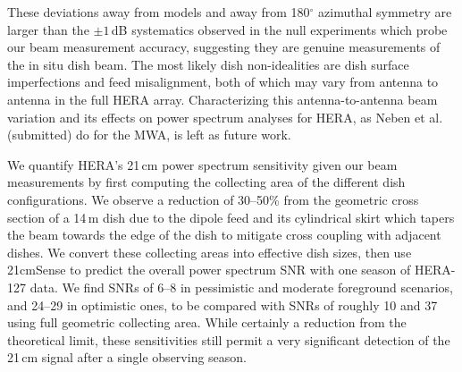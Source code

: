 \documentclass{emulateapj}
\begin{document}
These deviations away from models and away from 180$^\circ$ azimuthal symmetry are larger than the $\pm1$\,dB systematics observed in the null experiments which probe our beam measurement accuracy, suggesting they are genuine measurements of the in situ dish beam. The most likely dish non-idealities are dish surface imperfections and feed misalignment, both of which may vary from antenna to antenna in the full HERA array. Characterizing this antenna-to-antenna beam variation and its effects on power spectrum analyses for HERA, as Neben et al. (submitted) do for the MWA, is left as future work.

We quantify HERA's 21\,cm power spectrum sensitivity given our beam measurements by first computing the collecting area of the different dish configurations. We observe a reduction of 30--50\% from the geometric cross section of a 14\,m dish due to the dipole feed and its cylindrical skirt which tapers the beam towards the edge of the dish to mitigate cross coupling with adjacent dishes. We convert these collecting areas into effective dish sizes, then use 21cmSense to predict the overall power spectrum SNR with one season of HERA-127 data. We find SNRs of 6--8 in pessimistic and moderate foreground scenarios, and 24--29 in optimistic ones, to be compared with SNRs of roughly 10 and 37 using full geometric collecting area. While certainly a reduction from the theoretical limit, these sensitivities still permit a very significant detection of the 21\,cm signal after a single observing season.
\end{document}
